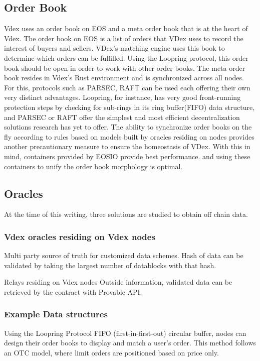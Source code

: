 \documentclass[]{article}
\begin{document}
{\subsection{Order Book}
Vdex uses an order book on EOS and a meta order book that is at the heart of Vdex. 
The order book on EOS is a list of orders that VDex uses to record the interest of buyers and sellers. 
VDex's matching engine uses this book to determine which orders can be fulfilled.
Using the Loopring protocol, this order book should be open in order to work with other order books.\cite{7}
The meta order book resides in Vdex's Rust environment and is synchronized across all nodes.
For this, protocols such as PARSEC, RAFT can be used each offering their own very distinct advantages. Loopring, for instance, has very good front-running protection steps by checking for sub-rings in its ring buffer(FIFO) data structure, and PARSEC or RAFT offer the simplest and most efficient decentralization solutions research has yet to offer.
The ability to synchronize order books on the fly according to rules based on models built by oracles residing on nodes provides another precautionary measure to ensure the homeostasis of VDex.
With this in mind, containers provided by EOSIO provide best performance.\cite{25} and
using these containers to unify the order book morphology is optimal.

\subsection{Oracles}
At the time of this writing, three solutions are studied to obtain off chain data.

\subsubsection{Vdex oracles residing on Vdex nodes}
Multi party source of truth for customized data schemes.
Hash of data can be validated by taking the largest number 
of datablocks with that hash.

{Relays residing on Vdex nodes}
Outside information, validated data can be retrieved by the contract with Provable API.


\subsubsection{Example Data structures}

Using the Loopring Protocol FIFO (first-in-first-out) circular buffer, nodes can design their order books to display and match a user’s order. This method follows an OTC model, where limit orders are positioned based on price only. \cite{7}  

}
\end{document}
